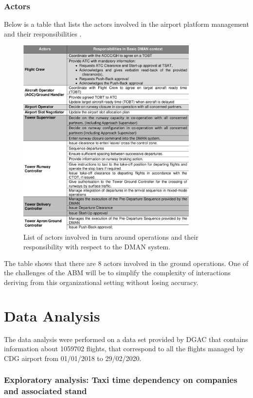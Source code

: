 \documentclass{article}
\begin{document}
\section{Actors}
Below is a table that lists the actors involved in the airport platform management and their responsibilities \cite{DMAN}.


\begin{figure}[h!!!!!!!!!!!!!!!!]

	\centering
	\includegraphics[width=9cm]{tabella.png}
	\caption{List of actors involved in turn around operations and their responsibility with respect to the DMAN system.}
	\label{actors}

\end{figure}

\bigskip
The table shows that there are 8 actors involved in the ground operations. One of the challenges of the ABM will be to simplify the complexity of interactions deriving from this organizational setting without losing accuracy.

\newpage
\part{Data Analysis}

The data analysis were performed on a data set provided by DGAC that contains information about 1059702 flights, that correspond to all the flights managed by CDG airport from 01/01/2018 to 29/02/2020.


\section{Exploratory analysis: Taxi time dependency on companies and associated stand}\label{exploratory}
\end{document}
